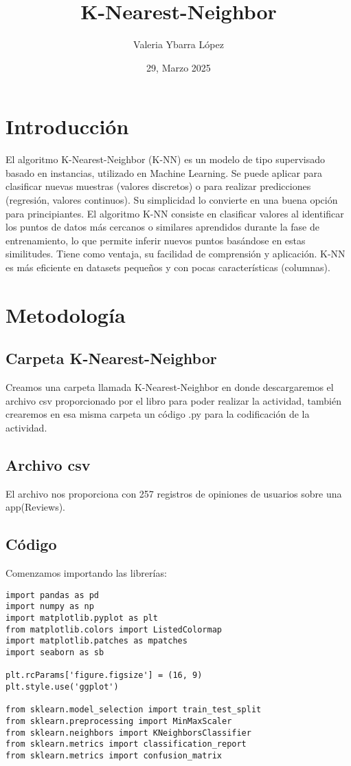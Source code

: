 \documentclass{article}
\title{K-Nearest-Neighbor}
\author{Valeria Ybarra López}
\date{29, Marzo 2025}
\begin{document}
\maketitle

\section{Introducción}

El algoritmo K-Nearest-Neighbor (K-NN) es un modelo de tipo supervisado basado en instancias, utilizado en Machine Learning. Se puede aplicar para clasificar nuevas muestras (valores discretos) o para realizar predicciones (regresión, valores continuos). Su simplicidad lo convierte en una buena opción para principiantes. El algoritmo K-NN consiste en clasificar valores al identificar los puntos de datos más cercanos o similares aprendidos durante la fase de entrenamiento, lo que permite inferir nuevos puntos basándose en estas similitudes.
Tiene como ventaja, su facilidad de comprensión y aplicación. K-NN es más eficiente en datasets pequeños y con pocas características (columnas).


\section{Metodología}

\subsection{Carpeta K-Nearest-Neighbor}
Creamos una carpeta llamada K-Nearest-Neighbor en donde descargaremos el archivo csv proporcionado por el libro para poder realizar la actividad, también crearemos en esa misma carpeta un código .py para la codificación de la actividad.


\subsection{Archivo csv}
El archivo nos proporciona con 257 registros de opiniones de usuarios sobre una app(Reviews).

\subsection{Código}
Comenzamos importando las librerías: 
\begin{lstlisting}
import pandas as pd
import numpy as np
import matplotlib.pyplot as plt
from matplotlib.colors import ListedColormap
import matplotlib.patches as mpatches
import seaborn as sb

plt.rcParams['figure.figsize'] = (16, 9)
plt.style.use('ggplot')

from sklearn.model_selection import train_test_split
from sklearn.preprocessing import MinMaxScaler
from sklearn.neighbors import KNeighborsClassifier
from sklearn.metrics import classification_report
from sklearn.metrics import confusion_matrix
\end{lstlisting}
\end{document}
